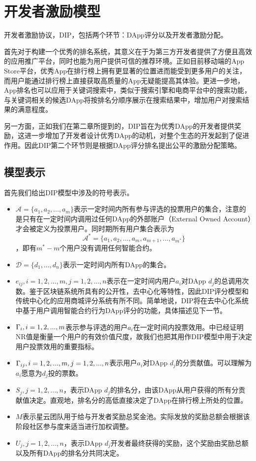 \section{开发者激励模型}
开发者激励协议，DIP，包括两个环节：DApp评分以及开发者激励分配。

首先对于构建一个优秀的排名系统，其意义在于为第三方开发者提供了方便且高效的应用推广平台，同时也能为用户提供可信的推荐环境。正如目前移动端的App Store平台，优秀App在排行榜上拥有更显著的位置进而能受到更多用户的关注，而用户能通过排行榜上直接获取高质量的App无疑能提高其体验。更进一步地，App排名也可以应用于关键词搜索中，类似于搜索引擎和电商平台中的搜索功能，与关键词相关的候选DApp将按排名分顺序展示在搜索结果中，增加用户对搜索结果的满意程度。

另一方面，正如我们在第二章所提到的，DIP旨在为优秀DApp的开发者提供奖励，这进一步增加了开发者设计优秀DApp的动机，对整个生态的开发起到了促进作用。因此DIP第二个环节则是根据DApp评分排名提出公平的激励分配策略。

\subsection{模型表示}
\label{subsection:parameters}
首先我们给出DIP模型中涉及的符号表示。
\begin{itemize}
	\item $\mathcal{A}=\{a_1,a_2,...,a_m\}$表示一定时间内所有参与评选的投票用户的集合，注意的是只有在一定时间内调用过任何DApp的外部账户（External Owned Account）才会被定义为投票用户。同时期所有用户集合表示为$$\mathcal{A}^*=\{a_1,a_2,...,a_m,a_{m+1},...,a_{m^*}\}$$，即有$m^*-m$个用户没有调用任何智能合约。
	\item $\mathcal{D}=\{d_1,...,d_n\}$表示一定时间内所有DApp的集合。
	\item $e_{ij},i=1,2,...,m, j=1,2,...,n$表示在一定时间内用户$a_i$对DApp $d_j$的总调用次数。鉴于区块链系统所具有的公开性，去中心化等特性，因此DIP评分模型和传统中心化的应用商城评分系统有所不同。简单地说，DIP将在去中心化系统中基于用户调用智能合约行为DApp评分的功能，具体描述见下一节。
	\item $\Gamma_i, i=1,2,...,m$表示参与评选的用户$a_i$在一定时间内投票效用。\cite{Nabulasyellowpaper}中已经证明NR值是衡量一个用户的有效价值尺度，故我们也把其用作DIP模型中用于决定用户投票效用的重要指标。
	\item $\Gamma_{ij}, i=1,2,...,m,j=1,2,...,n$表示用户$a_i$对DApp $d_j$的分贡献值。可以理解为$a_i$愿意为$d_j$投的票数。%
	\item $S_j, j=1,2,...,n$，表示DApp $d_j$的排名分，由该DApp从用户获得的所有分贡献值决定。直观地，排名分的高低直接决定了DApp在排行榜上所处的位置。%
	\item $M$表示星云团队用于给与开发者奖励总奖金池。实际发放的奖励总额会根据该阶段社区参与度来适当进行加权调整。
	\item $U_j, j=1,2,...,n$，表示DApp $d_j$开发者最终获得的奖励，这个奖励由奖励总额以及所有DApp的排名分共同决定。%
\end{itemize}


